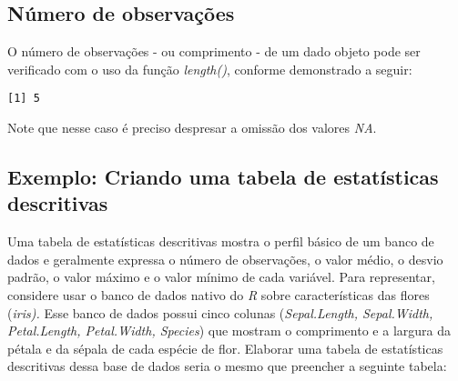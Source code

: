 \documentclass[
  letterpaper,
  DIV=11,
  numbers=noendperiod]{scrreprt}
\newenvironment{Shaded}{\begin{snugshade}}{\end{snugshade}}
\newcommand{\FunctionTok}[1]{\textcolor[rgb]{0.28,0.35,0.67}{#1}}
\newcommand{\NormalTok}[1]{\textcolor[rgb]{0.00,0.23,0.31}{#1}}
\newcommand{\SpecialCharTok}[1]{\textcolor[rgb]{0.37,0.37,0.37}{#1}}
\begin{document}
\subsection{Número de observações}\label{nuxfamero-de-observauxe7uxf5es}

O número de observações - ou comprimento - de um dado objeto pode ser
verificado com o uso da função \emph{length()}, conforme demonstrado a
seguir:

\begin{Shaded}
\end{Shaded}

\begin{verbatim}
[1] 5
\end{verbatim}

Note que nesse caso é preciso despresar a omissão dos valores \emph{NA}.

\subsection{Exemplo: Criando uma tabela de estatísticas
descritivas}\label{exemplo-criando-uma-tabela-de-estatuxedsticas-descritivas}

Uma tabela de estatísticas descritivas mostra o perfil básico de um
banco de dados e geralmente expressa o número de observações, o valor
médio, o desvio padrão, o valor máximo e o valor mínimo de cada
variável. Para representar, considere usar o banco de dados nativo do
\emph{R} sobre características das flores (\emph{iris).} Esse banco de
dados possui cinco colunas (\emph{Sepal.Length, Sepal.Width,
Petal.Length, Petal.Width, Species}) que mostram o comprimento e a
largura da pétala e da sépala de cada espécie de flor. Elaborar uma
tabela de estatísticas descritivas dessa base de dados seria o mesmo que
preencher a seguinte tabela:
\end{document}
